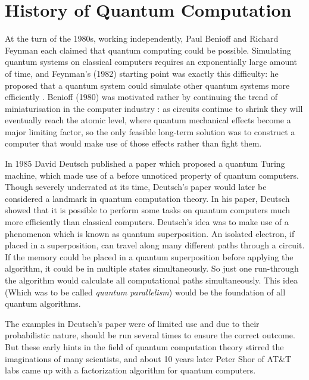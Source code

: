 \setcounter{equation}{0}
\section{History of Quantum Computation}


At the turn of the 1980s, working independently, Paul Benioff and Richard Feynman each claimed that quantum computing could be possible. Simulating quantum systems on classical computers requires an exponentially large amount of time, and Feynman's (1982) starting point was exactly this difficulty: he proposed that a quantum system could simulate other quantum systems more efficiently \cite{spwc82}. Benioff (1980) was motivated rather by continuing the trend of miniaturisation in the computer industry \cite{cps80}: as circuits continue to shrink they will eventually reach the atomic level, where quantum mechanical effects become a major limiting factor, so the only feasible long-term solution was to construct a computer that would make use of those effects rather than fight them.

In 1985 David Deutsch published a paper \cite{qtct85} which proposed a quantum Turing machine, which made use of a before unnoticed property of quantum computers. Though severely underrated at its time, Deutsch's paper would later be considered a landmark in quantum computation theory. In his paper, Deutsch showed that it is possible to perform some tasks on quantum computers much more efficiently than classical computers. Deutsch's idea was to make use of a phenomenon which is known as quantum superposition. An isolated electron, if placed in a superposition, can travel along many different paths through a circuit. If the memory could be placed in a quantum superposition before applying the algorithm, it could be in multiple states simultaneously. So just one run-through the algorithm would calculate all computational paths simultaneously. This idea (Which was to be called \emph{quantum parallelism}) would be the foundation of all quantum algorithms.

The examples in Deutsch's paper were of limited use and due to their probabilistic nature, should be run several times to ensure the correct outcome. But these early hints in the field of quantum computation theory stirred the imaginations of many scientists, and about 10 years later Peter Shor of AT\&T labs came up with a factorization algorithm for quantum computers.


